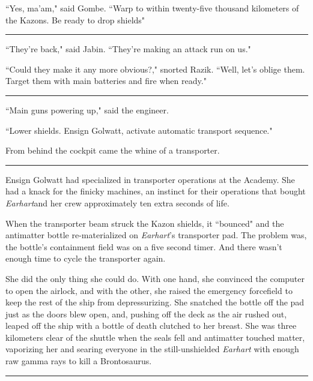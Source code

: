 \documentclass[twoside,letterpaper,12pt]{memoir}
\begin{document}
``Yes, ma'am," said Gombe. ``Warp to within twenty-five thousand kilometers of the Kazons. Be ready to drop shields"

\begin{center}\rule{3cm}{0.4 pt}\end{center}

``They're back," said Jabin. ``They're making an attack run on us."

``Could they make it any more obvious?," snorted Razik. ``Well, let's oblige them. Target them with main batteries and fire when ready."

\begin{center}\rule{3cm}{0.4 pt}\end{center}

``Main guns powering up," said the engineer.

``Lower shields. Ensign Golwatt, activate automatic transport sequence."

From behind the cockpit came the whine of a transporter.

\begin{center}\rule{3cm}{0.4 pt}\end{center}

Ensign Golwatt had specialized in transporter operations at the Academy. She had a knack for the finicky machines, an instinct for their operations that bought \textit{Earhart}and her crew approximately ten extra seconds of life.

When the transporter beam struck the Kazon shields, it ``bounced" and the antimatter bottle re-materialized on \textit{Earhart}'s transporter pad. The problem was, the bottle's containment field was on a five second timer. And there wasn't enough time to cycle the transporter again.

She did the only thing she could do. With one hand, she convinced the computer to open the airlock, and with the other, she raised the emergency forcefield to keep the rest of the ship from depressurizing. She snatched the bottle off the pad just as the doors blew open, and, pushing off the deck as the air rushed out, leaped off the ship with a bottle of death clutched to her breast. She was three kilometers clear of the shuttle when the seals fell and antimatter touched matter, vaporizing her and searing everyone in the still-unshielded \textit{Earhart} with enough raw gamma rays to kill a Brontosaurus.

\begin{center}\rule{3cm}{0.4 pt}\end{center}
\end{document}
